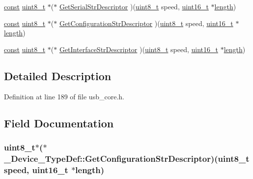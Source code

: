\begin{DoxyCompactItemize}
\item 
\hyperlink{group___n_a_m_e_ga7ae6d0e43244213b34de2c2b9aa30da6}{const} \hyperlink{stdint_8h_aba7bc1797add20fe3efdf37ced1182c5}{uint8\-\_\-t} $\ast$($\ast$ \hyperlink{struct___device___type_def_ad56536c92056405c56898cf1b2dc2d06}{Get\-Serial\-Str\-Descriptor} )(\hyperlink{stdint_8h_aba7bc1797add20fe3efdf37ced1182c5}{uint8\-\_\-t} speed, \hyperlink{stdint_8h_a273cf69d639a59973b6019625df33e30}{uint16\-\_\-t} $\ast$\hyperlink{mavlink__helpers_8h_a4254bfa282bd215965d99b8d6b527a04}{length})
\item 
\hyperlink{group___n_a_m_e_ga7ae6d0e43244213b34de2c2b9aa30da6}{const} \hyperlink{stdint_8h_aba7bc1797add20fe3efdf37ced1182c5}{uint8\-\_\-t} $\ast$($\ast$ \hyperlink{struct___device___type_def_ae9162f3af25c47f5f83502aa10c4405a}{Get\-Configuration\-Str\-Descriptor} )(\hyperlink{stdint_8h_aba7bc1797add20fe3efdf37ced1182c5}{uint8\-\_\-t} speed, \hyperlink{stdint_8h_a273cf69d639a59973b6019625df33e30}{uint16\-\_\-t} $\ast$\hyperlink{mavlink__helpers_8h_a4254bfa282bd215965d99b8d6b527a04}{length})
\item 
\hyperlink{group___n_a_m_e_ga7ae6d0e43244213b34de2c2b9aa30da6}{const} \hyperlink{stdint_8h_aba7bc1797add20fe3efdf37ced1182c5}{uint8\-\_\-t} $\ast$($\ast$ \hyperlink{struct___device___type_def_a74dcc0a2046bc9b9d6e9cb91a7d95847}{Get\-Interface\-Str\-Descriptor} )(\hyperlink{stdint_8h_aba7bc1797add20fe3efdf37ced1182c5}{uint8\-\_\-t} speed, \hyperlink{stdint_8h_a273cf69d639a59973b6019625df33e30}{uint16\-\_\-t} $\ast$\hyperlink{mavlink__helpers_8h_a4254bfa282bd215965d99b8d6b527a04}{length})
\end{DoxyCompactItemize}


\subsection{Detailed Description}


Definition at line 189 of file usb\-\_\-core.\-h.



\subsection{Field Documentation}
\hypertarget{struct___device___type_def_ae9162f3af25c47f5f83502aa10c4405a}{
\subsubsection[{Get\-Configuration\-Str\-Descriptor}]{ {\bf uint8\-\_\-t}$\ast$($\ast$ \-\_\-\-Device\-\_\-\-Type\-Def\-::\-Get\-Configuration\-Str\-Descriptor)({\bf uint8\-\_\-t} speed, {\bf uint16\-\_\-t} $\ast${\bf length})}}\label{struct___device___type_def_ae9162f3af25c47f5f83502aa10c4405a}


